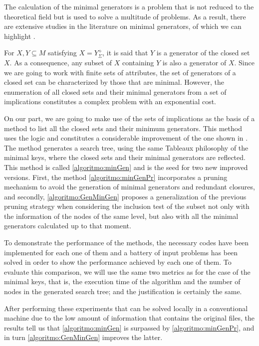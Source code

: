 The calculation of the minimal generators is a problem that is not reduced to the theoretical field but is used to solve a multitude of problems. As a result, there are extensive studies in the literature on minimal generators, of which we can highlight \cite{Poelmans2013, Qu2007, Missaoui2012}.

For $ X,Y \subseteq M$ satisfying $X = Y^+_\Sigma$, it is said that $Y$ is a generator of the closed set $X$. As a consequence, any subset of $X$ containing $Y$ is also a generator of $X$. Since we are going to work with finite sets of attributes, the set of generators of a closed set can be characterized by those that are minimal. However, the enumeration of all closed sets and their minimal generators from a set of implications constitutes a complex problem with an exponential cost.

On our part, we are going to make use of the sets of implications as the basis of a method to list all the closed sets and their minimum generators. This method uses the logic \slfde and constitutes a considerable improvement of the one shown in \cite{Cordero2012}. The method generates a search tree, using the same Tableaux philosophy of the minimal keys, where the closed sets and their minimal generators are reflected. This method is called \ref{algoritmo:minGen} and is the seed for two new improved versions. First, the method \ref{algoritmo:minGenPr} incorporates a pruning mechanism to avoid the generation of minimal generators and redundant closures, and secondly, \ref{algoritmo:GenMinGen} proposes a generalization of the previous pruning strategy when considering the inclusion test of the subset not only with the information of the nodes of the same level, but also with all the minimal generators calculated up to that moment.

To demonstrate the performance of the methods, the necessary codes have been implemented for each one of them and a battery of input problems has been solved in order to show the performance achieved by each one of them. To evaluate this comparison, we will use the same two metrics as for the case of the minimal keys, that is, the execution time of the algorithm and the number of nodes in the generated search tree; and the justification is certainly the same.

After performing these experiments that can be solved locally in a conventional machine due to the low amount of information that contains the original files, the results tell us that \ref{algoritmo:minGen} is surpassed by \ref{algoritmo:minGenPr}, and in turn \ref{algoritmo:GenMinGen} improves the latter.

